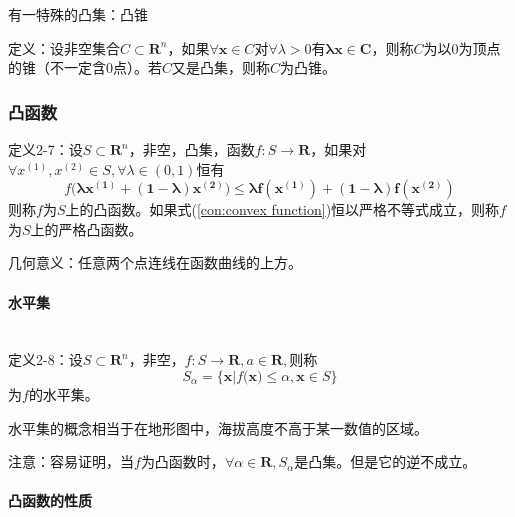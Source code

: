 \documentclass{book}
\newcommand{\subsubsubsection}[1]{\paragraph{#1}\mbox{}\\}
\begin{document}
有一特殊的凸集：凸锥

定义：设非空集合$C\subset\boldsymbol{R}^n$，如果$\forall\boldsymbol{x}\in C$对$\forall\lambda>0$有$\boldsymbol{\lambda x \in C}$，则称$C$为以0为顶点的锥（不一定含$0$点）。若$C$又是凸集，则称$C$为凸锥。

\subsubsection{凸函数}
定义2-7：设$S\subset \boldsymbol{R}^n$，非空，凸集，函数$f:S\rightarrow \boldsymbol{R}$，如果对$\forall x^{(1)}, x^{(2)}\in S, \forall\lambda\in (0,1)$恒有
\begin{equation}
f(\boldsymbol{\lambda x^{(1)}+(1-\boldsymbol{\lambda})\boldsymbol{x^{(2)}})\le\boldsymbol{\lambda}f(\boldsymbol{x^{(1)}})+(1-\boldsymbol{\lambda})f(\boldsymbol{x^{(2)}})}
\label{con:convex function}
\end{equation}
则称$f$为$S$上的凸函数。如果式(\ref{con:convex function})恒以严格不等式成立，则称$f$为$S$上的严格凸函数。

几何意义：任意两个点连线在函数曲线的上方。

\subsubsubsection{水平集}
定义2-8：设$S\subset\boldsymbol{R}^n$，非空，$f:S\rightarrow\boldsymbol{R}, a\in \boldsymbol{R},$则称
\begin{equation}
    S_{\alpha}=\{\boldsymbol{x}|f(\boldsymbol{x)}\le\alpha,\boldsymbol{x}\in S\}
    \label{con:level set}
\end{equation}
为$f$的水平集。

水平集的概念相当于在地形图中，海拔高度不高于某一数值的区域。

注意：容易证明，当$f$为凸函数时，$\forall\alpha\in\boldsymbol{R}, S_{\alpha}$是凸集。但是它的逆不成立。

\subsubsubsection{凸函数的性质}
\end{document}

